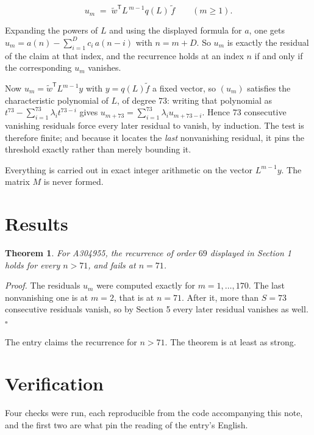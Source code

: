\documentclass[11pt]{article}
\newtheorem{theorem}{Theorem}
\theoremstyle{definition}
\begin{document}
\[u_m \;=\; \tilde w^{\mathsf T} L^{\,m-1} q(L)\,\tilde f \qquad (m \ge 1).\]

Expanding the powers of $L$ and using the displayed formula for $a$, one gets $u_m = a(n) - \sum_{i=1}^{D} c_i\,a(n-i)$ with $n = m + D$. So $u_m$ is exactly the residual of the claim at that index, and the recurrence holds at an index $n$ if and only if the corresponding $u_m$ vanishes.

Now $u_m = \tilde w^{\mathsf T} L^{m-1} y$ with $y = q(L)\tilde f$ a fixed vector, so $(u_m)$ satisfies the characteristic polynomial of $L$, of degree $73$: writing that polynomial as $t^{73} - \sum_{i=1}^{73} \lambda_i t^{73-i}$ gives $u_{m+73} = \sum_{i=1}^{73} \lambda_i u_{m+73-i}$. Hence $73$ consecutive vanishing residuals force every later residual to vanish, by induction. The test is therefore finite; and because it locates the {\itshape last} nonvanishing residual, it pins the threshold exactly rather than merely bounding it.

Everything is carried out in exact integer arithmetic on the vector $L^{m-1}y$. The matrix $M$ is never formed.

\section{Results}

\begin{theorem} For A304955, the recurrence of order $69$ displayed in Section 1 holds for every $n > 71$, and fails at $n = 71$.\end{theorem}

{\itshape Proof.} The residuals $u_m$ were computed exactly for $m = 1,\dots,170$. The last nonvanishing one is at $m = 2$, that is at $n = 71$. After it, more than $S = 73$ consecutive residuals vanish, so by Section 5 every later residual vanishes as well. $\square$

The entry claims the recurrence for $n > 71$. The theorem is at least as strong.

\section{Verification}

Four checks were run, each reproducible from the code accompanying this note, and the first two are what pin the reading of the entry's English.
\end{document}
